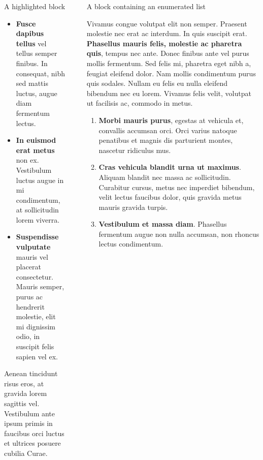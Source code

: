 \documentclass[final]{beamer}
\newlength{\sepwidth}
\newlength{\colwidth}
\newcommand{\separatorcolumn}{\begin{column}{\sepwidth}\end{column}}
\begin{document}
\begin{frame}[t]
\begin{columns}[t]
\begin{column}{\colwidth}
\begin{alertblock}{A highlighted block}
				\begin{itemize}
					\item \textbf{Fusce dapibus tellus} vel tellus semper finibus. In
					      consequat, nibh sed mattis luctus, augue diam fermentum lectus.
					\item \textbf{In euismod erat metus} non ex. Vestibulum luctus augue in
					      mi condimentum, at sollicitudin lorem viverra.
					\item \textbf{Suspendisse vulputate} mauris vel placerat consectetur.
					      Mauris semper, purus ac hendrerit molestie, elit mi dignissim odio, in
					      suscipit felis sapien vel ex.
				\end{itemize}

				Aenean tincidunt risus eros, at gravida lorem sagittis vel. Vestibulum ante
				ipsum primis in faucibus orci luctus et ultrices posuere cubilia Curae.

			\end{alertblock}

		\end{column}

		\separatorcolumn

		\begin{column}{\colwidth}

			\begin{block}{A block containing an enumerated list}

				Vivamus congue volutpat elit non semper. Praesent molestie nec erat ac
				interdum. In quis suscipit erat. \textbf{Phasellus mauris felis, molestie
					ac pharetra quis}, tempus nec ante. Donec finibus ante vel purus mollis
				fermentum. Sed felis mi, pharetra eget nibh a, feugiat eleifend dolor. Nam
				mollis condimentum purus quis sodales. Nullam eu felis eu nulla eleifend
				bibendum nec eu lorem. Vivamus felis velit, volutpat ut facilisis ac,
				commodo in metus.

				\begin{enumerate}
					\item \textbf{Morbi mauris purus}, egestas at vehicula et, convallis
					      accumsan orci. Orci varius natoque penatibus et magnis dis parturient
					      montes, nascetur ridiculus mus.
					\item \textbf{Cras vehicula blandit urna ut maximus}. Aliquam blandit nec
					      massa ac sollicitudin. Curabitur cursus, metus nec imperdiet bibendum,
					      velit lectus faucibus dolor, quis gravida metus mauris gravida turpis.
					\item \textbf{Vestibulum et massa diam}. Phasellus fermentum augue non
					      nulla accumsan, non rhoncus lectus condimentum.
				\end{enumerate}


\end{block}
\end{column}
\end{columns}
\end{frame}
\end{document}
